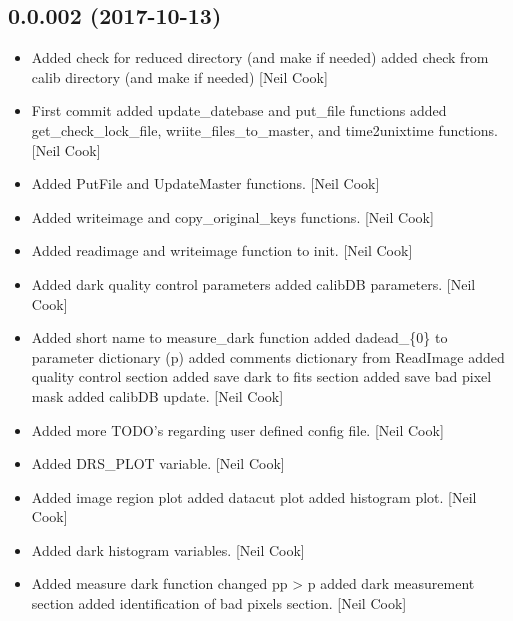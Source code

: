 \documentclass[a4paper,10pt,english]{report}
\begin{document}
\subsection{0.0.002 (2017-10-13)}
\label{\detokenize{misc/changelog:id547}}\begin{itemize}
\item {} 
Added check for reduced directory (and make if needed) added check
from calib directory (and make if needed) {[}Neil Cook{]}

\item {} 
First commit added update\_datebase and put\_file functions added
get\_check\_lock\_file, wriite\_files\_to\_master, and time2unixtime
functions. {[}Neil Cook{]}

\item {} 
Added PutFile and UpdateMaster functions. {[}Neil Cook{]}

\item {} 
Added writeimage and copy\_original\_keys functions. {[}Neil Cook{]}

\item {} 
Added readimage and writeimage function to init. {[}Neil Cook{]}

\item {} 
Added dark quality control parameters added calibDB parameters. {[}Neil
Cook{]}

\item {} 
Added short name to measure\_dark function added dadead\_\{0\} to
parameter dictionary (p) added comments dictionary from ReadImage
added quality control section added save dark to fits section added
save bad pixel mask added calibDB update. {[}Neil Cook{]}

\item {} 
Added more TODO’s regarding user defined config file. {[}Neil Cook{]}

\item {} 
Added DRS\_PLOT variable. {[}Neil Cook{]}

\item {} 
Added image region plot added datacut plot added histogram plot. {[}Neil
Cook{]}

\item {} 
Added dark histogram variables. {[}Neil Cook{]}

\item {} 
Added measure dark function changed pp \textendash{}\textgreater{} p added dark measurement
section added identification of bad pixels section. {[}Neil Cook{]}

\end{itemize}
\end{document}
